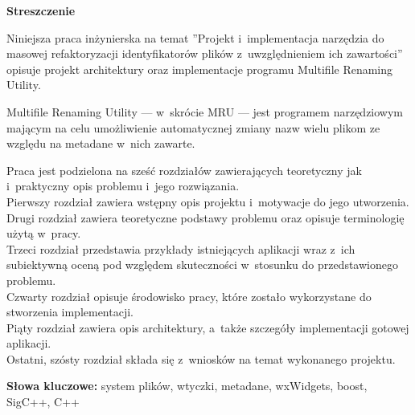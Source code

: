 \clearpage

\begin{center}
\textbf{Streszczenie}
\end{center}

\par
Niniejsza praca inżynierska na temat ''Projekt i~implementacja narzędzia do masowej refaktoryzacji identyfikatorów plików z~uwzględnieniem ich zawartości'' opisuje projekt architektury oraz implementacje programu Multifile Renaming Utility.
\par
Multifile Renaming Utility --- w~skrócie MRU --- jest programem narzędziowym mającym na celu umożliwienie automatycznej zmiany nazw wielu plikom ze względu na metadane w~nich zawarte.

\par
Praca jest podzielona na sześć rozdziałów zawierających teoretyczny jak i~praktyczny opis problemu i~jego rozwiązania.\\
Pierwszy rozdział zawiera wstępny opis projektu i~motywacje do jego utworzenia.\\
Drugi rozdział zawiera teoretyczne podstawy problemu oraz opisuje terminologię użytą w~pracy.\\
Trzeci rozdział przedstawia przykłady istniejących aplikacji wraz z~ich subiektywną oceną pod względem skuteczności w~stosunku do przedstawionego problemu.\\
Czwarty rozdział opisuje środowisko pracy, które zostało wykorzystane do stworzenia implementacji.\\
Piąty rozdział zawiera opis architektury, a~także szczegóły implementacji gotowej aplikacji.\\
Ostatni, szósty rozdział składa się z~wniosków na temat wykonanego projektu.

\vspace*{\baselineskip}

\noindent\textbf{Słowa kluczowe:} system plików, wtyczki, metadane, wxWidgets, boost, SigC++, C++
